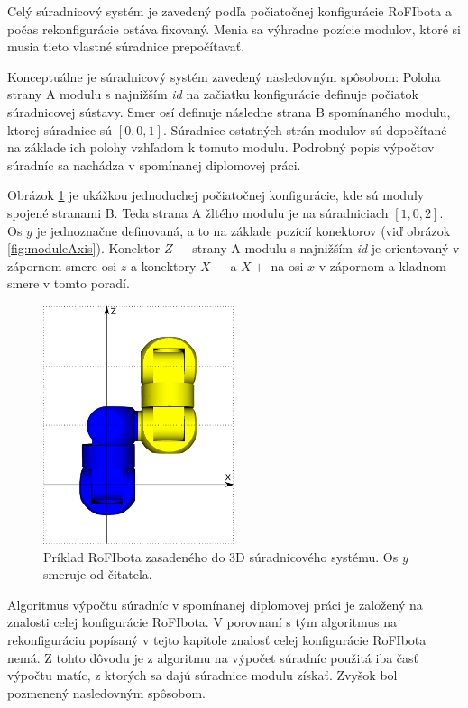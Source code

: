 \documentclass[
  digital, %
  oneside, %
  notable,   %
  lof,     %
  nolot,     %
]{fithesis3}
\begin{document}
Celý súradnicový systém je zavedený podľa počiatočnej konfigurácie RoFIbota a počas rekonfigurácie ostáva fixovaný. Menia sa výhradne pozície modulov, ktoré si musia tieto vlastné súradnice prepočítavať. 

Konceptuálne je súradnicový systém zavedený nasledovným spôsobom: Poloha strany A modulu s najnižším \textit{id} na začiatku konfigurácie definuje počiatok súradnicovej sústavy. Smer osí definuje následne strana B spomínaného modulu, ktorej súradnice sú $[0, 0, 1]$. Súradnice ostatných strán modulov sú dopočítané na základe ich polohy vzhľadom k tomuto modulu. Podrobný popis výpočtov súradníc sa nachádza v spomínanej diplomovej práci.  

Obrázok \ref{fig:moduleCoordinates} je ukážkou jednoduchej počiatočnej konfigurácie, kde sú moduly spojené stranami B. Teda strana A žltého modulu je na súradniciach $[1, 0, 2]$. Os $y$ je jednoznačne definovaná, a to na základe pozícií konektorov (viď obrázok \ref{fig:moduleAxis}). Konektor $Z-$ strany A modulu s najnižším \textit{id} je orientovaný v zápornom smere osi $z$ a konektory $X-$ a $X+$ na osi $x$ v zápornom a kladnom smere v tomto poradí. 

\begin{figure}[hbt!]
    \centering
    \includegraphics[width=0.5\textwidth]{pictures/module_coordinates.pdf}
    \caption[Ukážka súradnicového systému]{Príklad RoFIbota zasadeného do 3D súradnicového systému. Os $y$ smeruje od čitateľa. }
    \label{fig:moduleCoordinates}
\end{figure}

Algoritmus výpočtu súradníc v spomínanej diplomovej práci je založený na znalosti celej konfigurácie RoFIbota. V porovnaní s tým algoritmus na rekonfiguráciu popísaný v tejto kapitole znalosť celej konfigurácie RoFIbota nemá. Z tohto dôvodu je z algoritmu na výpočet súradníc použitá iba časť výpočtu matíc, z ktorých sa dajú súradnice modulu získať. Zvyšok bol pozmenený nasledovným spôsobom. 
\end{document}
